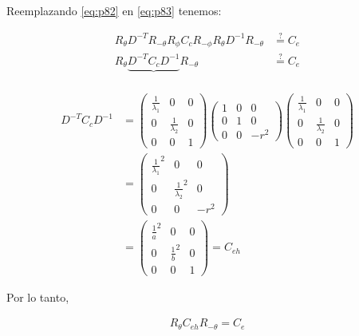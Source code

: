 Reemplazando \ref{eq:p82} en \ref{eq:p83} tenemos:

\begin{equation*}
\begin{aligned}
R_\theta D^{-T} R_{-\theta} R_\phi C_c R_{-\phi} R_{\theta} D^{-1} R_{-\theta} &\stackrel{?}{=} C_e \\
R_\theta \underbrace{D^{-T} C_c D^{-1}} R_{-\theta} &\stackrel{?}{=} C_e \\
\end{aligned}
\end{equation*} 

\begin{equation*}
\begin{aligned}
D^{-T} C_c D^{-1} &=
\begin{pmatrix}
\frac{1}{\lambda_1} & 0 & 0\\ 
0 & \frac{1}{\lambda_2} & 0\\
0 & 0 & 1
\end{pmatrix} 
\begin{pmatrix}
1 & 0 & 0 \\ 
0 & 1 & 0 \\
0 & 0 & -r^2
\end{pmatrix} 
\begin{pmatrix}
\frac{1}{\lambda_1} & 0 & 0\\ 
0 & \frac{1}{\lambda_2} & 0 \\
0 & 0 & 1
\end{pmatrix} \\
&= 
\begin{pmatrix}
\frac{1}{\lambda_1}^2 & 0 & 0\\ 
0 & \frac{1}{\lambda_2}^2 & 0\\
0 & 0 & -r^2
\end{pmatrix} \\
&= 
\begin{pmatrix}
\frac{1}{a}^2 & 0 & 0\\ 
0 & \frac{1}{b}^2 & 0\\
0 & 0 & 1
\end{pmatrix} = C_{eh}
\end{aligned}
\end{equation*} 

Por lo tanto,

\begin{equation*}
\begin{aligned}
R_\theta
C_{eh}
R_{-\theta}
=
C_e
\end{aligned}
\end{equation*} 

